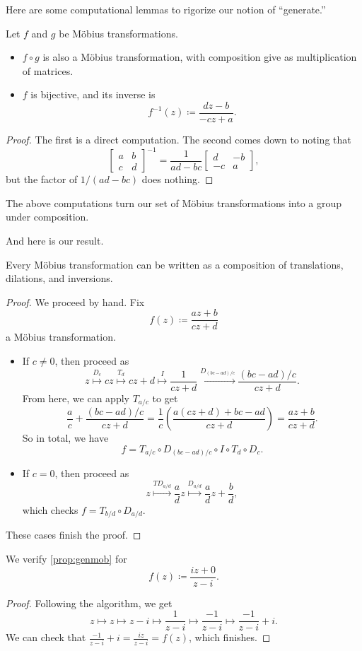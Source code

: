 Here are some computational lemmas to rigorize our notion of ``generate.''
\begin{lemma} \label{lem:mobgrp}
	Let $f$ and $g$ be M\"obius transformations.
	\begin{itemize}
		\item $f\circ g$ is also a M\"obius transformation, with composition give as multiplication of matrices.
		\item $f$ is bijective, and its inverse is
		\[f^{-1}(z)\coloneqq\frac{dz-b}{-cz+a}.\]
	\end{itemize}
\end{lemma}
\begin{proof}
	The first is a direct computation. The second comes down to noting that
	\[\begin{bmatrix}
		a & b \\
		c & d
	\end{bmatrix}^{-1}=\frac1{ad-bc}\begin{bmatrix}
		d & -b \\
		-c & a
	\end{bmatrix},\]
	but the factor of $1/(ad-bc)$ does nothing.
\end{proof}
\begin{remark}
	The above computations turn our set of M\"obius transformations into a group under composition.
\end{remark}
And here is our result.
\begin{proposition} \label{prop:genmob}
	Every M\"obius transformation can be written as a composition of translations, dilations, and inversions.
\end{proposition}
\begin{proof}
	We proceed by hand. Fix
	\[f(z)\coloneqq\frac{az+b}{cz+d}\]
	a M\"obius transformation.
	\begin{itemize}
		\item If $c\ne0$, then proceed as
		\[z\stackrel{D_c}\longmapsto cz\stackrel{T_d}\longmapsto cz+d\stackrel{I}\longmapsto\frac1{cz+d}\stackrel{D_{(bc-ad)/c}}\longmapsto\frac{(bc-ad)/c}{cz+d}.\]
		From here, we can apply $T_{a/c}$ to get
		\[\frac ac+\frac{(bc-ad)/c}{cz+d}=\frac1c\left(\frac{a(cz+d)+bc-ad}{cz+d}\right)=\frac{az+b}{cz+d}.\]
		So in total, we have
		\[f=T_{a/c}\circ D_{(bc-ad)/c}\circ I\circ T_d\circ D_c.\]
		\item If $c=0$, then proceed as
		\[z\stackrel{TD_{a/d}}\longmapsto\frac adz\stackrel{D_{a/d}}\longmapsto\frac adz+\frac bd,\]
		which checks $f=T_{b/d}\circ D_{a/d}$.
	\end{itemize}
	These cases finish the proof.
\end{proof}
\begin{exe}
	We verify \autoref{prop:genmob} for
	\[f(z)\coloneqq\frac{iz+0}{z-i}.\]
\end{exe}
\begin{proof}
	Following the algorithm, we get
	\[z\longmapsto z\longmapsto z-i\longmapsto\frac1{z-i}\longmapsto\frac{-1}{z-i}\longmapsto\frac{-1}{z-i}+i.\]
	We can check that $\frac{-1}{z-i}+i=\frac{iz}{z-i}=f(z)$, which finishes.
\end{proof}

